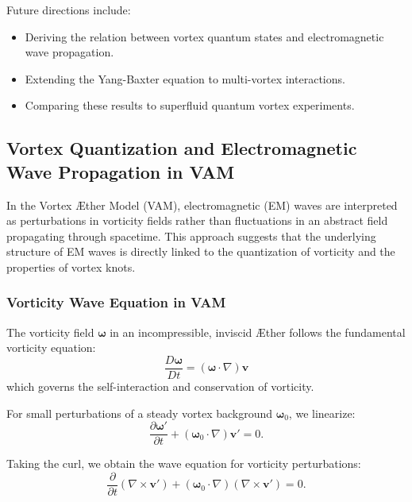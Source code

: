 \documentclass[a4paper,10pt]{article}
\begin{document}
Future directions include:
\begin{itemize}
    \item Deriving the relation between vortex quantum states and electromagnetic wave propagation.
    \item Extending the Yang-Baxter equation to multi-vortex interactions.
    \item Comparing these results to superfluid quantum vortex experiments.
\end{itemize}

    \subsection{Vortex Quantization and Electromagnetic Wave Propagation in VAM}

In the Vortex Æther Model (VAM), electromagnetic (EM) waves are interpreted as perturbations in vorticity fields rather than fluctuations in an
abstract field propagating through spacetime. This approach suggests that the underlying structure of EM waves is directly linked to the quantization of vorticity and the properties of vortex knots.

\subsubsection*{Vorticity Wave Equation in VAM}

The vorticity field $\boldsymbol{\omega}$ in an incompressible, inviscid Æther follows the fundamental vorticity equation:
\begin{equation*}
    \frac{D\boldsymbol{\omega}}{Dt} = (\boldsymbol{\omega} \cdot \nabla) \mathbf{v}
\end{equation*}
which governs the self-interaction and conservation of vorticity.

For small perturbations of a steady vortex background $\boldsymbol{\omega}_0$, we linearize:
\begin{equation*}
    \frac{\partial \boldsymbol{\omega}'}{\partial t} + (\boldsymbol{\omega}_0 \cdot \nabla) \mathbf{v}' = 0.
\end{equation*}

Taking the curl, we obtain the wave equation for vorticity perturbations:
\begin{equation*}
    \frac{\partial}{\partial t} (\nabla \times \mathbf{v}') + (\boldsymbol{\omega}_0 \cdot \nabla) (\nabla \times \mathbf{v}') = 0.
\end{equation*}
\end{document}
